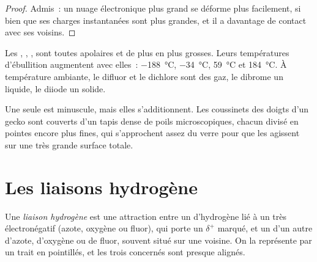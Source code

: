 \begin{proof}
Admis~: un nuage électronique plus grand se déforme plus facilement, si
bien que ses charges instantanées sont plus grandes, et il a davantage
de contact avec ses voisins.
\end{proof}

\begin{example}\label{ex:g11:polarity-and-cohesion:halogens}
Les  , , ,  sont toutes apolaires
et de plus en plus grosses. Leurs températures d'ébullition augmentent
avec elles~: \qty{-188}{\celsius}, \qty{-34}{\celsius}, \qty{59}{\celsius}
et \qty{184}{\celsius}. À température ambiante, le difluor et le dichlore
sont des gaz, le dibrome un liquide, le diiode un solide.
\end{example}

\begin{remark}[Le gecko]\label{rem:g11:polarity-and-cohesion:gecko}
Une seule  est minuscule, mais elles
s'additionnent. Les coussinets des doigts d'un gecko sont couverts d'un
tapis dense de poils microscopiques, chacun divisé en pointes encore
plus fines, qui s'approchent assez du verre pour que les  agissent sur une très grande surface totale.
\end{remark}

\section{Les liaisons hydrogène}

\begin{definition}\label{def:g11:polarity-and-cohesion:hydrogen-bond}
Une \emph{liaison hydrogène} est une attraction
entre un  d'hydrogène lié à un  très électronégatif (azote,
oxygène ou fluor), qui porte un $\delta^+$ marqué, et un  d'un autre  d'azote, d'oxygène ou de fluor, souvent situé sur
une  voisine. On la représente par un trait en pointillés, et
les trois  concernés sont presque alignés.
\end{definition}


